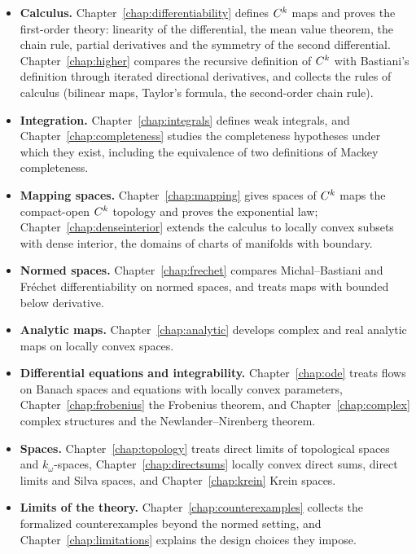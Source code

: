 \begin{itemize}
  \item \textbf{Calculus.} Chapter~\ref{chap:differentiability} defines $C^{k}$ maps and proves
    the first-order theory: linearity of the differential, the mean value theorem, the chain
    rule, partial derivatives and the symmetry of the second differential.
    Chapter~\ref{chap:higher} compares the recursive definition of $C^{k}$ with Bastiani's
    definition through iterated directional derivatives, and collects the rules of calculus
    (bilinear maps, Taylor's formula, the second-order chain rule).
  \item \textbf{Integration.} Chapter~\ref{chap:integrals} defines weak integrals, and
    Chapter~\ref{chap:completeness} studies the completeness hypotheses under which they exist,
    including the equivalence of two definitions of Mackey completeness.
  \item \textbf{Mapping spaces.} Chapter~\ref{chap:mapping} gives spaces of $C^{k}$ maps the
    compact-open $C^{k}$ topology and proves the exponential law;
    Chapter~\ref{chap:denseinterior} extends the calculus to locally convex subsets with dense
    interior, the domains of charts of manifolds with boundary.
  \item \textbf{Normed spaces.} Chapter~\ref{chap:frechet} compares Michal--Bastiani and
    Fréchet differentiability on normed spaces, and treats maps with bounded below derivative.
  \item \textbf{Analytic maps.} Chapter~\ref{chap:analytic} develops complex and real analytic
    maps on locally convex spaces.
  \item \textbf{Differential equations and integrability.} Chapter~\ref{chap:ode} treats flows
    on Banach spaces and equations with locally convex parameters, Chapter~\ref{chap:frobenius}
    the Frobenius theorem, and Chapter~\ref{chap:complex} complex structures and the
    Newlander--Nirenberg theorem.
  \item \textbf{Spaces.} Chapter~\ref{chap:topology} treats direct limits of topological spaces
    and $k_\omega$-spaces, Chapter~\ref{chap:directsums} locally convex direct sums, direct limits
    and Silva spaces, and Chapter~\ref{chap:krein} Krein spaces.
  \item \textbf{Limits of the theory.} Chapter~\ref{chap:counterexamples} collects the
    formalized counterexamples beyond the normed setting, and Chapter~\ref{chap:limitations}
    explains the design choices they impose.
\end{itemize}

